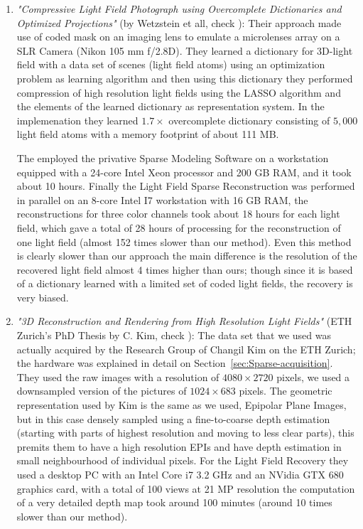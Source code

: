 \begin{enumerate}
\item \textit{"Compressive Light Field Photograph using Overcomplete Dictionaries and Optimized Projections"} (by Wetzstein et all, check \cite{CompressedMIT}): Their approach made use of coded mask on an imaging lens to emulate a microlenses array on a SLR Camera (Nikon 105 mm f/2.8D). They learned a dictionary for 3D-light field with a data set of scenes (light field atoms) using an optimization problem as learning algorithm and then using this dictionary they performed compression of high resolution light fields using the LASSO algorithm \cite{LASSO} and the elements of the learned dictionary as representation system. In the implemenation they learned $1.7\times$ overcomplete dictionary consisting of $5,000$ light field atoms with a memory footprint of about 111 MB. 

The employed the privative Sparse Modeling Software \cite{SparseSoft} on a workstation equipped with a 24-core Intel Xeon processor and 200 GB RAM, and it took about 10 hours. Finally the Light Field Sparse Reconstruction was performed in parallel on an 8-core Intel I7 workstation with 16 GB RAM, the reconstructions for three color channels took about 18 hours for each light field, which gave a total of 28 hours of processing for the reconstruction of one light field (almost 152 times slower than our method). Even this method is clearly slower than our approach the main difference is the resolution of the recovered light field almost 4 times higher than ours; though since it is based of a dictionary learned with a limited set of coded light fields, the recovery is very biased. 

\item \textit{"3D Reconstruction and Rendering from High Resolution Light Fields"} (ETH Zurich's PhD Thesis by C. Kim, check \cite{Kim-Disney}): The data set that we used was actually acquired by the Research Group of Changil Kim on the ETH Zurich; the hardware was explained in detail on Section~\ref{sec:Sparse-acquisition}. They used the raw images with a resolution of $4080\times 2720$ pixels, we used a downsampled version of the pictures of $1024\times683$ pixels. The geometric representation used by Kim is the same as we used, Epipolar Plane Images, but in this case densely sampled using a fine-to-coarse depth estimation (starting with parts of highest resolution and moving to less clear parts), this premits them to have a high resolution EPIs and have depth estimation in small neighbourhood of individual pixels. For the Light Field Recovery they used a desktop PC with an Intel Core i7 3.2 GHz and an NVidia GTX 680 graphics card, with a total of 100 views at 21 MP resolution the computation of a very detailed depth map took around 100 minutes (around 10 times slower than our method). 


\end{enumerate}
